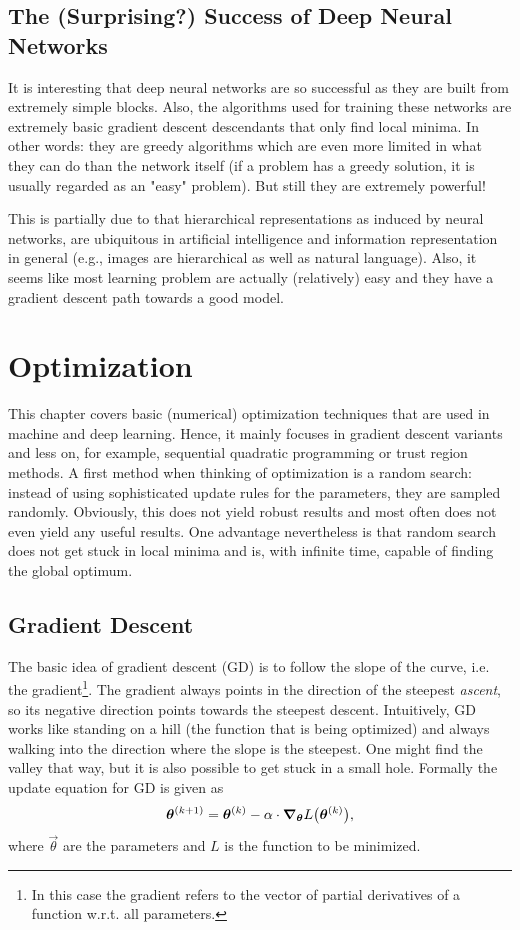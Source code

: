 	\section{The (Surprising?) Success of Deep Neural Networks}
		It is interesting that deep neural networks are so successful as they are built from extremely simple blocks. Also, the algorithms used for training these networks are extremely basic gradient descent descendants that only find local minima. In other words: they are greedy algorithms which are even more limited in what they can do than the network itself (if a problem has a greedy solution, it is usually regarded as an "easy" problem). But still they are extremely powerful!

		This is partially due to that hierarchical representations as induced by neural networks, are ubiquitous in artificial intelligence and information representation in general (e.g., images are hierarchical as well as natural language). Also, it seems like most learning problem are actually (relatively) easy and they have a gradient descent path towards a good model.

\chapter{Optimization}
	\label{c:optimization}

	This chapter covers basic (numerical) optimization techniques that are used in machine and deep learning. Hence, it mainly focuses in gradient descent variants and less on, for example, sequential quadratic programming or trust region methods. A first method when thinking of optimization is a random search: instead of using sophisticated update rules for the parameters, they are sampled randomly. Obviously, this does not yield robust results and most often does not even yield any useful results. One advantage nevertheless is that random search does not get stuck in local minima and is, with infinite time, capable of finding the global optimum.

	\section{Gradient Descent}
		The basic idea of gradient descent (GD) is to follow the slope of the curve, i.e. the gradient\footnote{In this case the gradient refers to the vector of partial derivatives of a function w.r.t. all parameters.}. The gradient always points in the direction of the steepest \emph{ascent}, so its negative direction points towards the steepest descent. Intuitively, GD works like standing on a hill (the function that is being optimized) and always walking into the direction where the slope is the steepest. One might find the valley that way, but it is also possible to get stuck in a small hole. Formally the update equation for GD is given as
		\begin{equation}
			\bm{\theta}^{(k + 1)} = \bm{\theta}^{(k)} - \alpha \cdot \grad_{\bm{\theta}} L\bigl( \bm{\theta}^{(k)} \bigr),
		\end{equation}
		where \(\vec{\theta}\) are the parameters and \(L\) is the function to be minimized.

